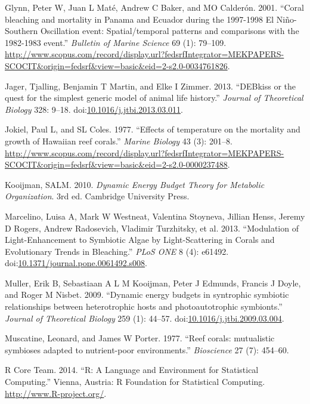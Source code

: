 \documentclass[]{elsarticle} %
\begin{document}
\hypertarget{ref-Glynn:2001p7571}{}
Glynn, Peter W, Juan L Maté, Andrew C Baker, and MO Calderón. 2001.
``Coral bleaching and mortality in Panama and Ecuador during the
1997-1998 El Niño-Southern Oscillation event: Spatial/temporal patterns
and comparisons with the 1982-1983 event.'' \emph{Bulletin of Marine
Science} 69 (1): 79--109.
\url{http://www.scopus.com/record/display.url?fedsrfIntegrator=MEKPAPERS-SCOCIT\&origin=fedsrf\&view=basic\&eid=2-s2.0-0034761826}.

\hypertarget{ref-Jager:2013bj}{}
Jager, Tjalling, Benjamin T Martin, and Elke I Zimmer. 2013. ``DEBkiss
or the quest for the simplest generic model of animal life history.''
\emph{Journal of Theoretical Biology} 328: 9--18.
doi:\href{https://doi.org/10.1016/j.jtbi.2013.03.011}{10.1016/j.jtbi.2013.03.011}.

\hypertarget{ref-Jokiel:1977p7353}{}
Jokiel, Paul L, and SL Coles. 1977. ``Effects of temperature on the
mortality and growth of Hawaiian reef corals.'' \emph{Marine Biology} 43
(3): 201--8.
\url{http://www.scopus.com/record/display.url?fedsrfIntegrator=MEKPAPERS-SCOCIT\&origin=fedsrf\&view=basic\&eid=2-s2.0-0000237488}.

\hypertarget{ref-Kooijman:2010vd}{}
Kooijman, SALM. 2010. \emph{Dynamic Energy Budget Theory for Metabolic
Organization}. 3rd ed. Cambridge University Press.

\hypertarget{ref-Marcelino:2013hz}{}
Marcelino, Luisa A, Mark W Westneat, Valentina Stoyneva, Jillian Henss,
Jeremy D Rogers, Andrew Radosevich, Vladimir Turzhitsky, et al. 2013.
``Modulation of Light-Enhancement to Symbiotic Algae by Light-Scattering
in Corals and Evolutionary Trends in Bleaching.'' \emph{PLoS ONE} 8 (4):
e61492.
doi:\href{https://doi.org/10.1371/journal.pone.0061492.s008}{10.1371/journal.pone.0061492.s008}.

\hypertarget{ref-Muller:2009io}{}
Muller, Erik B, Sebastiaan A L M Kooijman, Peter J Edmunds, Francis J
Doyle, and Roger M Nisbet. 2009. ``Dynamic energy budgets in syntrophic
symbiotic relationships between heterotrophic hosts and photoautotrophic
symbionts.'' \emph{Journal of Theoretical Biology} 259 (1): 44--57.
doi:\href{https://doi.org/10.1016/j.jtbi.2009.03.004}{10.1016/j.jtbi.2009.03.004}.

\hypertarget{ref-Muscatine:1977p4220}{}
Muscatine, Leonard, and James W Porter. 1977. ``Reef corals: mutualistic
symbioses adapted to nutrient-poor environments.'' \emph{Bioscience} 27
(7): 454--60.

\hypertarget{ref-RALanguageandEn:2014wf}{}
R Core Team. 2014. ``R: A Language and Environment for Statistical
Computing.'' Vienna, Austria: R Foundation for Statistical Computing.
\url{http://www.R-project.org/}.
\end{document}
